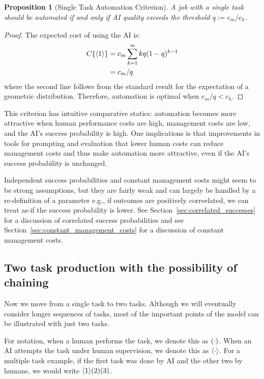 \documentclass{article}
\theoremstyle{plain}
\theoremstyle{plain}
\newtheorem{proposition}[theorem]{Proposition}
\begin{document}
\begin{proposition}[Single Task Automation Criterion] \label{proposition:single}
A job with a single task should be automated if and only if AI quality exceeds the threshold $\underline{q} := c_m / c_h$.
\end{proposition}
\begin{proof}
The expected cost of using the AI is:
\begin{align*}
    C\{ \langle 1 \rangle \} &= c_m \sum_{k=1}^{\infty} k q(1-q)^{k-1} \\
    &= c_m/q
\end{align*}
where the second line follows from the standard result for the expectation of a geometric distribution.
Therefore, automation is optimal when $c_m/q < c_h$.
\end{proof}

This criterion has intuitive comparative statics: automation becomes more attractive when human performance costs are high, management costs are low, and the AI's success probability is high.
One implications is that improvements in tools for prompting and evaluation that lower human costs can reduce management costs and thus make automation more attractive, even if the AI's success probability is unchanged.

Independent success probabilities and constant management costs might seem to be strong assumptions, but they are fairly weak and can largely be handled by a re-definition of a parameter e.g., if outcomes are positively correelated, we can treat as-if the success probability is lower. 
See Section~\ref{sec:correlated_successes} for a discussion of correlated success probabilities and see Section~\ref{sec:constant_management_costs} for a discussion of constant management costs.

\subsection{Two task production with the possibility of chaining}
Now we move from a single task to two tasks.  
Although we will eventually consider longer sequences of tasks, most of the important points of the model can be illustrated with just two tasks.

For notation, when a human performs the task, we denote this as $( \cdot )$.
When an AI attempts the task under human supervision, we denote this as $\langle \cdot \rangle$.
For a multiple task example, if the first task was done by AI and the other two by humans, we would write $\langle 1 \rangle( 2 )( 3 )$.
\end{document}
